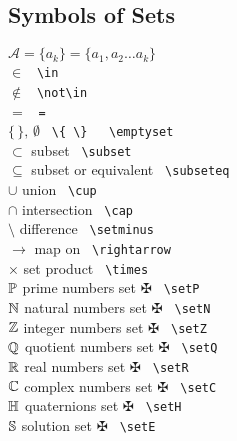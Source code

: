 \subsection{Symbols of Sets}
\begin{tabbing}
\mySymbols
 $\mathcal{A}=\{a_k\}=\{a_1,a_2\dots a_k\}$ \\
 $\in $                \>                     \> \verb` \in  `  \\
 $\not\in $            \>                     \> \verb` \not\in  `  \\
 $= $                  \>                     \> \verb` = `  \\
 $\{\,\},\,\emptyset$  \>                     \> \verb` \{ \}   \emptyset`  \\
 $\subset     $        \> subset                    \> \verb` \subset`  \\
 $\subseteq   $        \> subset or equivalent \> \verb` \subseteq`  \\
 $\cup        $        \> union               \> \verb` \cup         `  \\
 $\cap        $        \> intersection        \> \verb` \cap         `  \\
 $\setminus   $        \> difference          \> \verb` \setminus    `  \\
 $\rightarrow $        \> map on              \> \verb` \rightarrow  `  \\
 $\times      $        \> set product         \> \verb` \times       `  \\
 $\mathbb{P} $              \> prime numbers set   \> $\maltese$ \verb` \setP  `  \\
 $\mathbb{N} $              \> natural numbers set \> $\maltese$ \verb` \setN  `  \\
 $\mathbb{Z} $              \> integer numbers set \> $\maltese$ \verb` \setZ  `  \\
 $\mathbb{Q} $              \> quotient numbers set\> $\maltese$ \verb` \setQ  `  \\
 $\mathbb{R} $              \> real numbers set    \> $\maltese$ \verb` \setR  `  \\
 $\mathbb{C} $              \> complex numbers set \> $\maltese$ \verb` \setC  `  \\
 $\mathbb{H} $              \> quaternions set     \> $\maltese$ \verb` \setH  `  \\
 $\mathbb{S} $              \> solution set        \> $\maltese$ \verb` \setE  `  \\
\end{tabbing}

